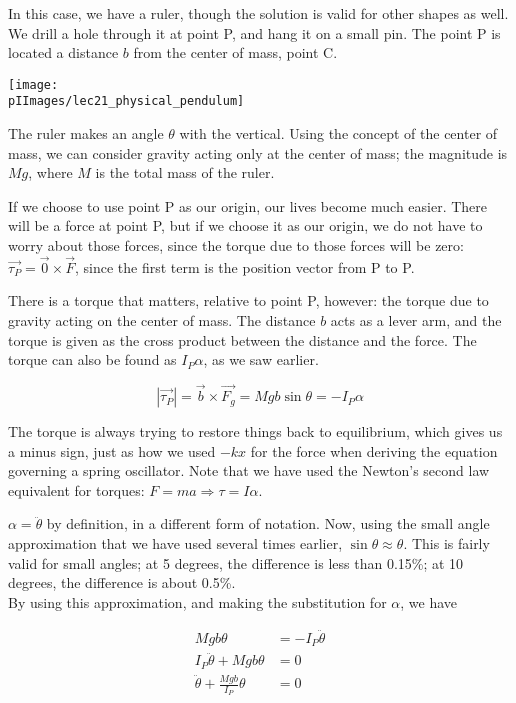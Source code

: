 In this case, we have a ruler, though the solution is valid for other shapes as well. We drill a hole through it at point P, and hang it on a small pin. The point P is located a distance $b$ from the center of mass, point C.

\begin{center}
\texttt{[image: \\pIImages/lec21\_physical\_pendulum]}
\end{center}

The ruler makes an angle $\theta$ with the vertical. Using the concept of the center of mass, we can consider gravity acting only at the center of mass; the magnitude is $M g$, where $M$ is the total mass of the ruler.

If we choose to use point P as our origin, our lives become much easier. There will be a force at point P, but if we choose it as our origin, we do not have to worry about those forces, since the torque due to those forces will be zero: $\vec{\tau_P} = \vec{0} \times \vec{F}$, since the first term is the position vector from P to P.

There is a torque that matters, relative to point P, however: the torque due to gravity acting on the center of mass. The distance $b$ acts as a lever arm, and the torque is given as the cross product between the distance and the force. The torque can also be found as $I_P \alpha$, as we saw earlier.

\begin{equation}
|\vec{\tau_P}| = \vec{b} \times \vec{F_g} = M g b \sin \theta = - I_P \alpha
\end{equation}

The torque is always trying to restore things back to equilibrium, which gives us a minus sign, just as how we used $- k x$ for the force when deriving the equation governing a spring oscillator. Note that we have used the Newton's second law equivalent for torques: $F = m a \Rightarrow \tau = I \alpha$.

$\alpha = \ddot{\theta}$ by definition, in a different form of notation. Now, using the small angle approximation that we have used several times earlier, $\sin \theta \approx \theta$. This is fairly valid for small angles; at 5 degrees, the difference is less than 0.15\%; at 10 degrees, the difference is about 0.5\%.\\
By using this approximation, and making the substitution for $\alpha$, we have

\begin{align}
M g b \theta &= - I_P \ddot{\theta}\\
I_P \ddot{\theta} + M g b \theta &= 0\\
\ddot{\theta} + \frac{M g b}{I_P} \theta &= 0
\end{align}

